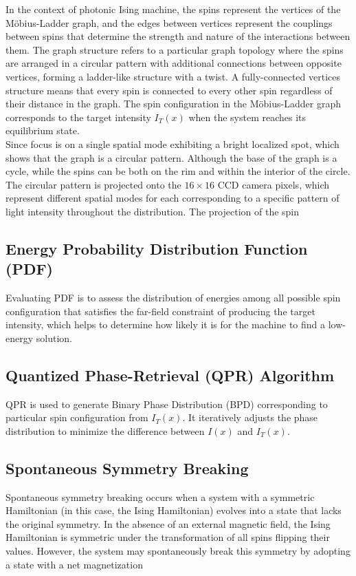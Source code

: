 In the context of photonic Ising machine, the spins represent the vertices of the Möbius-Ladder graph, and the edges between vertices represent the couplings between spins that determine the strength and nature of the interactions between them. The graph structure refers to a particular graph topology where the spins are arranged in a circular pattern with additional connections between opposite vertices, forming a ladder-like structure with a twist. A fully-connected vertices structure means that every spin is connected to every other spin regardless of their distance in the graph. The spin configuration in the Möbius-Ladder graph corresponds to the target intensity $I_T(x)$ when the system reaches its equilibrium state. \\

Since focus is on a single spatial mode exhibiting a bright localized spot, which shows that the graph is a circular pattern. Although the base of the graph is a cycle, while the spins can be both on the rim and within the interior of the circle. The circular pattern is projected onto the $16 \times 16$ CCD camera pixels, which represent different spatial modes for each corresponding to a specific pattern of light intensity throughout the distribution. The projection of the spin \\ 

\subsection{Energy Probability Distribution Function (PDF)} 
Evaluating PDF is to assess the distribution of energies among all possible spin configuration that satisfies the far-field constraint of producing the target intensity, which helps to determine how likely it is for the machine to find a low-energy solution.

\subsection{Quantized Phase-Retrieval (QPR) Algorithm} 
QPR is used to generate Binary Phase Distribution (BPD) corresponding to particular spin configuration from $I_T(x)$. It iteratively adjusts the phase distribution to minimize the difference between $I(x)$ and $I_T(x)$. 

\subsection{Spontaneous Symmetry Breaking}
Spontaneous symmetry breaking occurs when a system with a symmetric Hamiltonian (in this case, the Ising Hamiltonian) evolves into a state that lacks the original symmetry. In the absence of an external magnetic field, the Ising Hamiltonian is symmetric under the transformation of all spins flipping their values. However, the system may spontaneously break this symmetry by adopting a state with a net magnetization \\

